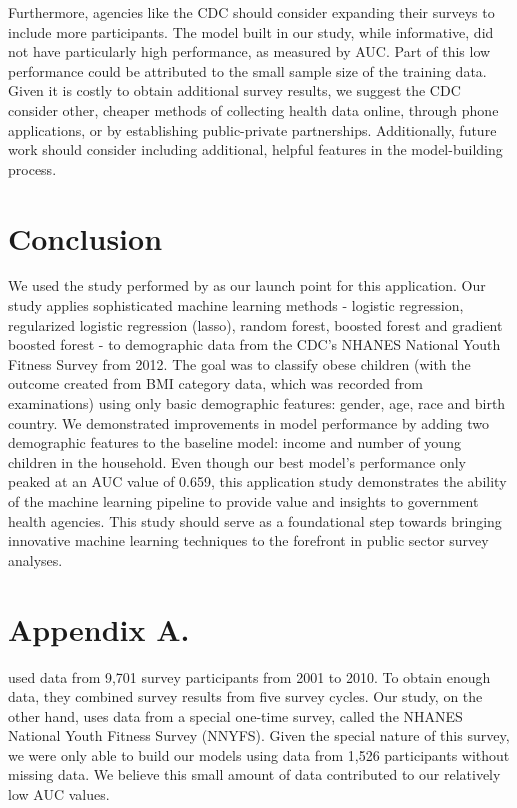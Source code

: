 \documentclass[twoside,11pt]{article}
\begin{document}
Furthermore, agencies like the CDC should consider expanding their surveys to include more participants. The model built in our study, while informative, did not have particularly high performance, as measured by AUC. Part of this low performance could be attributed to the small sample size of the training data. Given it is costly to obtain additional survey results, we suggest the CDC consider other, cheaper methods of collecting health data online, through phone applications, or by establishing public-private partnerships. Additionally, future work should consider including additional, helpful features in the model-building process. 


\section{Conclusion} \label{conclusion}
We used the study performed by \cite{kaur:17} as our launch point for this application. Our study applies sophisticated machine learning methods - logistic regression, regularized logistic regression (lasso), random forest, boosted forest and gradient boosted forest - to demographic data from the CDC's NHANES National Youth Fitness Survey from 2012. The goal was to classify obese children (with the outcome created from BMI category data, which was recorded from examinations) using only basic demographic features: gender, age, race and birth country. We demonstrated improvements in model performance by adding two demographic features to the baseline model: income and number of young children in the household. Even though our best model's performance only peaked at an AUC value of 0.659, this application study demonstrates the ability of the machine learning pipeline to provide value and insights to government health agencies. This study should serve as a foundational step towards bringing innovative machine learning techniques to the forefront in public sector survey analyses.




\appendix
\section*{Appendix A.}\label{aa}
\cite{kaur:17} used data from 9,701 survey participants from 2001 to 2010. To obtain enough data, they combined survey results from five survey cycles. Our study, on the other hand, uses data from a special one-time survey, called the NHANES National Youth Fitness Survey (NNYFS). Given the special nature of this survey, we were only able to build our models using data from 1,526 participants without missing data. We believe this small amount of data contributed to our relatively low AUC values. 
\end{document}
